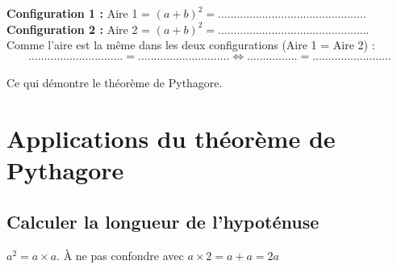 \textbf{Configuration 1 :} Aire 1 = $(a+b)^2 = ...............................................$
\\[0.5cm]

\textbf{Configuration 2 :} Aire 2 = $(a+b)^2 = ................................................$
\\[0.2cm]

Comme l'aire est la même dans les deux configurations (Aire 1 = Aire 2) :
$$ .............................. = ............................. \Leftrightarrow ................ = .........................$$ \\
Ce qui démontre le théorème de Pythagore.

\section{Applications du théorème de Pythagore}

\subsection{Calculer la longueur de l'hypoténuse}

\begin{remarkbox}[Important]
$a^2 = a\times a$. À ne pas confondre avec $a \times 2 = a + a = 2a$
\end{remarkbox}


